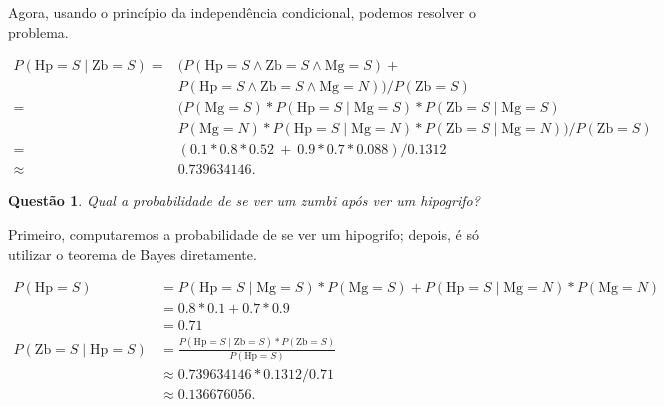 \documentclass{article}
\newtheorem{question}{Questão}
\newcommand{\Mg}{\mathrm{Mg}}
\newcommand{\Hp}{\mathrm{Hp}}
\newcommand{\Zb}{\mathrm{Zb}}
\begin{document}
Agora, usando o princípio da independência condicional,
podemos resolver o problema.

\begin{align*}
    P( \Hp = S \mid \Zb = S) =&
        \Big( P( \Hp = S \wedge \Zb = S \wedge \Mg = S) + {} \\
        & P( \Hp = S \wedge \Zb = S \wedge \Mg = N) \Big) / P(\Zb = S)\\
        =& \Big( P(\Mg = S) * P(\Hp = S \mid \Mg = S) * P(\Zb = S \mid \Mg = S) \\
         & P(\Mg = N) * P(\Hp = S \mid \Mg = N) * P(\Zb = S \mid \Mg = N) \Big) /
           P(\Zb = S)\\
        =& ( 0.1*0.8*0.52 \ +\  0.9*0.7*0.088 ) / 0.1312 \\
        \approx & 0.739634146.
\end{align*}

\begin{question}
    Qual a probabilidade de se ver um zumbi após ver um hipogrifo?
\end{question}

Primeiro, computaremos a probabilidade de se ver um hipogrifo;
depois, é só utilizar o teorema de Bayes diretamente.

\begin{align*}
    P(\Hp = S) &= P(\Hp = S \mid \Mg = S) * P(\Mg = S) +
        P(\Hp = S \mid \Mg = N) * P(\Mg = N) \\
        &= 0.8*0.1 + 0.7*0.9 \\
        &= 0.71 \\
    P(\Zb = S \mid \Hp = S) &= \frac{P(\Hp = S \mid \Zb = S) * P(\Zb = S)}{P(\Hp = S)} \\
        &\approx 0.739634146 * 0.1312 / 0.71\\
        &\approx 0.136676056.
\end{align*}
\end{document}
